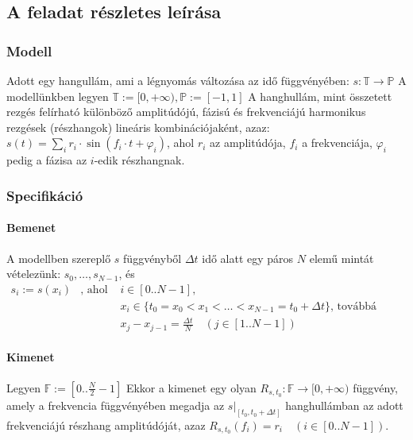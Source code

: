 
\subsection{A feladat r\'eszletes le\'ir\'asa}
\subsubsection{Modell}
Adott egy hangull\'am, ami a l\'egnyom\'as v\'altoz\'asa az id\H o f\"uggv\'eny\'eben:
\(s: \mathbb{T} \rightarrow \mathbb{P} \) \newline
A modell\"unkben legyen $\mathbb{T}:=[0,+\infty), \mathbb{P}:=[-1,1] $ \newline
A hanghull\'am, mint \"osszetett rezg\'es fel\'irhat\'o k\"ul\"onb\"oz\H o amplit\'ud\'oj\'u, f\'azis\'u \'es frekvenci\'aj\'u harmonikus rezg\'esek (r\'eszhangok) line\'aris kombin\'aci\'ojak\'ent, azaz: \newline
\( s(t) = \sum_i r_i\cdot\sin{(f_i\cdot t + \varphi_i)} \), ahol $r_i$ az amplit\'ud\'oja, $f_i$ a frekvenci\'aja, $\varphi_i$ pedig a f\'azisa az $i$-edik r\'eszhangnak.
\subsubsection{Specifik\'aci\'o}
\paragraph{Bemenet}
A modellben szerepl\H o $s$ f\"uggv\'enyb\H ol $\Delta t$ id\H o alatt egy p\'aros $N$ elem\H u mint\'at v\'etelez\"unk: $s_0,\dots,s_{N-1}$, \'es \newline
\( \begin{array}{rcl}
s_i := s(x_i) & \text{, ahol } & i\in[0..N-1],\\
&&x_i\in\{ t_0 = x_0 < x_1 < \dots < x_{N-1} = t_0 + \Delta t \} \text{, tov\'abb\'a } \\
&&x_j - x_{j-1} = \frac{\Delta t}{N}\quad (j\in[1..N-1] ) 
\end{array} \)
\paragraph{Kimenet}
Legyen $\mathbb{F}:=\left[ 0..\frac{N}{2}-1 \right]$ \newline 
Ekkor a kimenet egy olyan $R_{s,t_0}:\mathbb{F} \rightarrow [0,+\infty)$ f\"uggv\'eny, amely a frekvencia f\"uggv\'eny\'eben megadja az $s\rvert_{[t_0,t_0+\Delta t]}$ hanghull\'amban az adott frekvenci\'aj\'u r\'eszhang amplit\'ud\'oj\'at, azaz $R_{s,t_0}(f_i) = r_i\quad (i\in [0..N-1])$.

